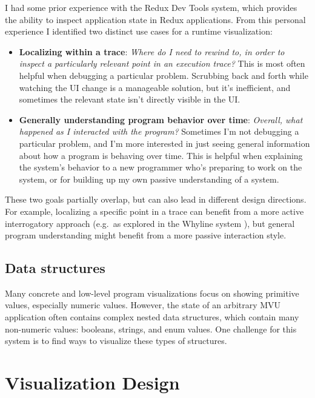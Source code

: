 \documentclass{sigchi}
\providecommand{\tightlist}{%
  \setlength{\itemsep}{0pt}\setlength{\parskip}{0pt}}
\begin{document}
I had some prior experience with the Redux Dev Tools system, which
provides the ability to inspect application state in Redux applications.
From this personal experience I identified two distinct use cases for a
runtime visualization:

\begin{itemize}
\tightlist
\item
  \textbf{Localizing within a trace}: \emph{Where do I need to rewind
  to, in order to inspect a particularly relevant point in an execution
  trace?} This is most often helpful when debugging a particular
  problem. Scrubbing back and forth while watching the UI change is a
  manageable solution, but it's inefficient, and sometimes the relevant
  state isn't directly visible in the UI.
\item
  \textbf{Generally understanding program behavior over time}:
  \emph{Overall, what happened as I interacted with the program?}
  Sometimes I'm not debugging a particular problem, and I'm more
  interested in just seeing general information about how a program is
  behaving over time. This is helpful when explaining the system's
  behavior to a new programmer who's preparing to work on the system, or
  for building up my own passive understanding of a system.
\end{itemize}

These two goals partially overlap, but can also lead in different design
directions. For example, localizing a specific point in a trace can
benefit from a more active interrogatory approach (e.g.~as explored in
the Whyline system \autocite{ko2004}), but general program understanding
might benefit from a more passive interaction style.

\hypertarget{data-structures}{%
\subsection{Data structures}\label{data-structures}}

Many concrete and low-level program visualizations focus on showing
primitive values, especially numeric values. However, the state of an
arbitrary MVU application often contains complex nested data structures,
which contain many non-numeric values: booleans, strings, and enum
values. One challenge for this system is to find ways to visualize these
types of structures.

\hypertarget{sec:design}{%
\section{Visualization Design}\label{sec:design}}
\end{document}
